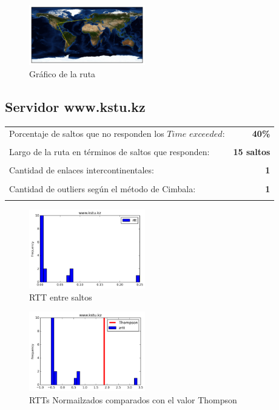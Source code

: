 \begin{figure}[H]
  \centering
    \includegraphics[width=0.45\textwidth]{grafico-rutas/www-fu-berlin-de.png}
  \caption{Gráfico de la ruta}
  \label{entropia-s}
\end{figure}




\subsection{Servidor www.kstu.kz}

\begin{center}
\begin{tabular}{p{6.5cm}r}
Porcentaje de saltos que no responden los $Time$ $exceeded$: & \textbf{40\%} \\ \\ 
Largo de la ruta en términos de saltos que responden: &\textbf{15 saltos} \\ \\
Cantidad de enlaces intercontinentales: & \textbf{1} \\ \\
Cantidad de outliers según el método de Cimbala: & \textbf{1} \\ \\
\end{tabular}
\end{center}


\begin{figure}[H]
  \centering
    \includegraphics[width=0.45\textwidth]{histogramas_rtt/www-kstu-kz.png}
  \caption{RTT entre saltos}
  \label{entropia-s}
\end{figure}

\begin{figure}[H]
  \centering
    \includegraphics[width=0.45\textwidth]{histogramas_thompson/www-kstu-kz.png}
  \caption{RTTs Normailzados comparados con el valor Thompson}
  \label{entropia-s}
\end{figure}

